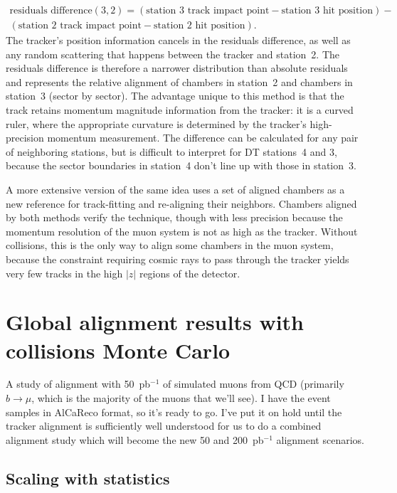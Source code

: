 \documentclass[12pt]{article}
\begin{document}
\begin{multline}
\mbox{residuals difference}(3, 2) = (\mbox{station 3 track impact point} - \mbox{station 3 hit position}) - \\
(\mbox{station 2 track impact point} - \mbox{station 2 hit position})\mbox{.}
\end{multline}
The tracker's position information cancels in the residuals
difference, as well as any random scattering that happens between the
tracker and station~2.  The residuals difference is therefore a
narrower distribution than absolute residuals and represents the
relative alignment of chambers in station~2 and chambers in station~3
(sector by sector).  The advantage unique to this method is that the
track retains momentum magnitude information from the tracker: it is a
curved ruler, where the appropriate curvature is determined by the
tracker's high-precision momentum measurement.  The difference can be
calculated for any pair of neighboring stations, but is difficult to
interpret for DT stations~4 and 3, because the sector boundaries in
station~4 don't line up with those in station~3.

A more extensive version of the same idea uses a set of aligned
chambers as a new reference for track-fitting and re-aligning their
neighbors.  Chambers aligned by both methods verify the technique,
though with less precision because the momentum resolution of the muon
system is not as high as the tracker.  Without collisions, this is the
only way to align some chambers in the muon system, because the
constraint requiring cosmic rays to pass through the tracker yields
very few tracks in the high $|z|$ regions of the detector.

\section{Global alignment results with collisions Monte Carlo}
\label{sec:mcstudy}

A study of alignment with 50~pb$^{-1}$ of simulated muons from QCD
(primarily $b\to\mu$, which is the majority of the muons that we'll
see).  I have the event samples in AlCaReco format, so it's ready to
go.  I've put it on hold until the tracker alignment is sufficiently
well understood for us to do a combined alignment study which will
become the new 50 and 200~pb$^{-1}$ alignment scenarios.

\subsection{Scaling with statistics}
\end{document}
